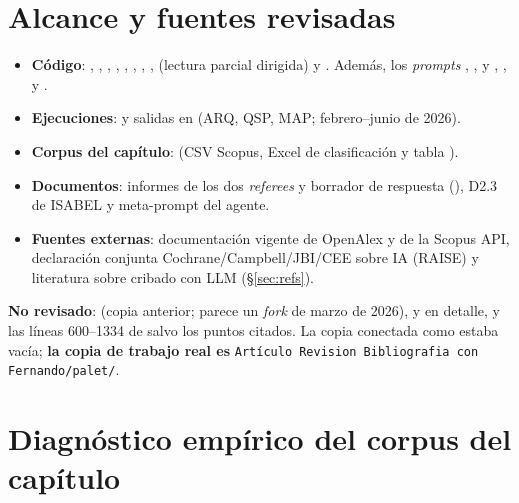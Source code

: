 \documentclass[11pt,a4paper]{article}
\begin{document}
\section{Alcance y fuentes revisadas}

\begin{itemize}
  \item \textbf{Código}: , , , , , , , ,  (lectura parcial dirigida) y . Además, los \emph{prompts} , ,  y , ,  y .
  \item \textbf{Ejecuciones}:  y salidas en  (ARQ, QSP, MAP; febrero--junio de 2026).
  \item \textbf{Corpus del capítulo}:  (CSV Scopus, Excel de clasificación y tabla ).
  \item \textbf{Documentos}: informes de los dos \emph{referees} y borrador de respuesta (), D2.3 de ISABEL y meta-prompt del agente.
  \item \textbf{Fuentes externas}: documentación vigente de OpenAlex y de la Scopus API, declaración conjunta Cochrane/Campbell/JBI/CEE sobre IA (RAISE) y literatura sobre cribado con LLM (§\ref{sec:refs}).
\end{itemize}

\textbf{No revisado}:  (copia anterior; parece un \emph{fork} de marzo de 2026),  y  en detalle, y las líneas 600--1334 de  salvo los puntos citados. La copia conectada como  estaba vacía; \textbf{la copia de trabajo real es} \texttt{Artículo Revision Bibliografia con Fernando/palet/}.

\section{Diagnóstico empírico del corpus del capítulo}\label{sec:diagnostico}
\end{document}
